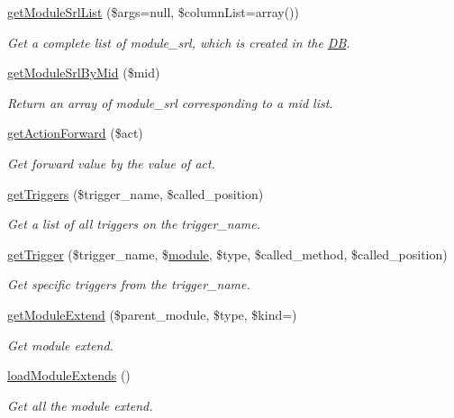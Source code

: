 \begin{DoxyCompactItemize}
\hyperlink{classmoduleModel_ae63e7e551002fac4c01a330a76dd7244}{get\+Module\+Srl\+List} (\$args=null, \$column\+List=array())
\begin{DoxyCompactList}\small\item\em Get a complete list of module\+\_\+srl, which is created in the \hyperlink{classDB}{DB}. \end{DoxyCompactList}\item 
\hyperlink{classmoduleModel_a857a241844d60b7678bd144175d23f29}{get\+Module\+Srl\+By\+Mid} (\$mid)
\begin{DoxyCompactList}\small\item\em Return an array of module\+\_\+srl corresponding to a mid list. \end{DoxyCompactList}\item 
\hyperlink{classmoduleModel_a2a06b59fa663c1e79f81aac571e2e5c8}{get\+Action\+Forward} (\$act)
\begin{DoxyCompactList}\small\item\em Get forward value by the value of act. \end{DoxyCompactList}\item 
\hyperlink{classmoduleModel_a979238a3b59bf52ccaa29ec3f7744808}{get\+Triggers} (\$trigger\+\_\+name, \$called\+\_\+position)
\begin{DoxyCompactList}\small\item\em Get a list of all triggers on the trigger\+\_\+name. \end{DoxyCompactList}\item 
\hyperlink{classmoduleModel_ae570716b47c7fd19b7fc0d217a155b22}{get\+Trigger} (\$trigger\+\_\+name, \$\hyperlink{classmodule}{module}, \$type, \$called\+\_\+method, \$called\+\_\+position)
\begin{DoxyCompactList}\small\item\em Get specific triggers from the trigger\+\_\+name. \end{DoxyCompactList}\item 
\hyperlink{classmoduleModel_a1dd3c03b874a4f6e05f6b5e8ec283665}{get\+Module\+Extend} (\$parent\+\_\+module, \$type, \$kind=\textquotesingle{}\textquotesingle{})
\begin{DoxyCompactList}\small\item\em Get module extend. \end{DoxyCompactList}\item 
\hyperlink{classmoduleModel_adfde81ebf0fcb2814ba49ad23ce803ff}{load\+Module\+Extends} ()
\begin{DoxyCompactList}\small\item\em Get all the module extend. \end{DoxyCompactList}\item 

\end{DoxyCompactItemize}
